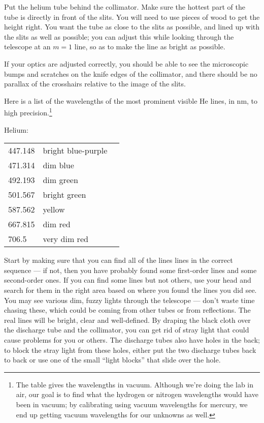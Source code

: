 Put the helium tube behind the collimator. Make sure the
hottest part of the tube is directly in
front of the slits. You will need to use pieces of wood to get the height right.
You want the tube as close to the slits as possible, and
lined up with the slits as well as possible; you can adjust
this while looking through the telescope at an $m=1$ line,
so as to make the line as bright as possible.

If your optics are adjusted correctly,
you should be able to see the microscopic
bumps and scratches on the knife edges of the collimator,
and there should be no parallax of the crosshairs relative
to the image of the slits.

Here is a list of the wavelengths of the most prominent visible He lines, in nm, to high 
precision.\footnote{The table gives the wavelengths in vacuum. Although we're doing the lab in air, our goal is to find
what the hydrogen or nitrogen wavelengths would have been in vacuum; by calibrating using vacuum wavelengths
for mercury, we end up getting vacuum wavelengths for our unknowns as well.}

Helium:\\
\noindent\begin{tabular}{llp{40mm}}
447.148 & bright blue-purple & \\
471.314 & dim blue & \\
492.193 & dim green & \\
501.567 & bright green & \\
587.562 & yellow & \\
667.815 & dim red & \\
706.5 & very dim red
\end{tabular}

Start by making sure
that you can find all of the lines lines in the correct sequence --- if
not, then you have probably found some first-order
lines and some second-order ones. If you can find some lines
but not others, use your head and search for them in the
right area based on where you found the lines you did see.
You may see various dim, fuzzy lights through the telescope
--- don't waste time chasing these, which could be coming
from other tubes or from reflections. The real lines will be
bright, clear and well-defined. By draping the black cloth over
the discharge tube and the collimator, you can get rid of stray
light that could cause problems for you or others. The discharge tubes also have
holes in the back; to block the stray
light from these holes, either put the two discharge tubes back
to back or use one of the small ``light blocks'' that slide over the hole.

